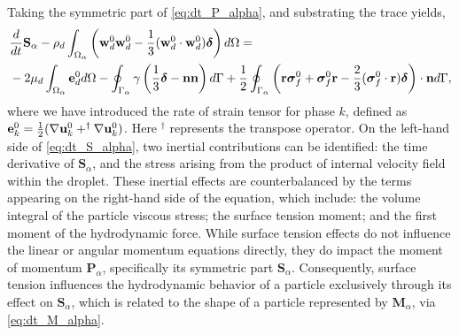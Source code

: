 Taking the symmetric part of \ref{eq:dt_P_alpha}, and substrating the trace yields, 
\begin{align}
    &\ddt {\textbf{S}_\alpha}
    - \rho_d\intO{\left(\textbf{w}_d^0 \textbf{w}_d^0 -\frac{1}{3} (\textbf{w}_d^0 \cdot  \textbf{w}_d^0)\bm\delta\right)}
    = \nonumber \\
    &- 2\mu_d\intO{\textbf{e}_d^0}
    -  \intS{ \gamma
        \left( \frac{1}{3}\bm\delta - \textbf{nn} \right)
    }
    + \frac{1}{2}\intS{\left(\textbf{r}\bm\sigma_f^0+\bm\sigma_f^0\textbf{r}-\frac{2}{3}(\bm\sigma_f^0 \cdot \textbf{r})\bm\delta \right)\cdot \textbf{n}},
    \label{eq:dt_S_alpha}
\end{align}
where we have introduced the rate of strain tensor for phase \( k \), defined as \( \mathbf{e}_k^0 = \frac{1}{2} (\mathbf{\nabla} \mathbf{u}_k^0 + ^\dagger \mathbf{\nabla} \mathbf{u}_k^0) \). 
Here $^\dagger$ represents the transpose operator. 
On the left-hand side of \ref{eq:dt_S_alpha}, two inertial contributions can be identified: the time derivative of $\mathbf{S}_\alpha$, and the stress arising from the product of internal velocity field within the droplet. 
These inertial effects are counterbalanced by the terms appearing on the right-hand side of the equation, which include: the volume integral of the particle viscous stress; the surface tension moment; and the first moment of the hydrodynamic force.
While surface tension effects do not influence the linear or angular momentum equations directly, they do impact the moment of momentum $\textbf{P}_\alpha$, specifically its symmetric part $\textbf{S}_\alpha$.
Consequently, surface tension influences the hydrodynamic behavior of a particle exclusively through its effect on $\textbf{S}_\alpha$, which is related to the shape of a particle represented by $\textbf{M}_\alpha$, via \ref{eq:dt_M_alpha}.
